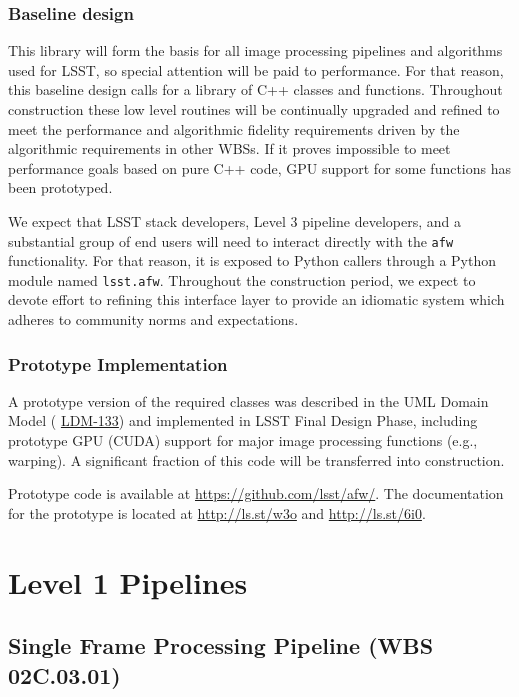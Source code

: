 \documentclass[12pt]{article}
\newcommand{\ds}[2]{{\color{blue} \href{https://docushare.lsstcorp.org/docushare/dsweb/Get/#1}{#2}}\xspace}
\newcommand{\appsUMLdomain}{\ds{LDM-133}{LDM-133}}
\newcommand{\wbsSFM}{WBS 02C.03.01}
\begin{document}
\subsubsection{Baseline design}

This library will form the basis for all image processing pipelines and algorithms used for LSST, so special attention will be paid to performance. For that reason, this baseline design calls for a library of C++ classes and functions. Throughout construction these low level routines will be continually upgraded and refined to meet the performance and algorithmic fidelity requirements driven by the algorithmic requirements in other WBSs. If it proves impossible to meet performance goals based on pure C++ code, GPU support for some functions has been prototyped.

We expect that LSST stack developers, Level 3 pipeline developers, and a substantial group of end users will need to interact directly with the \texttt{afw} functionality. For that reason, it is exposed to Python callers through a Python module named \texttt{lsst.afw}. Throughout the construction period, we expect to devote effort to refining this interface layer to provide an idiomatic system which adheres to community norms and expectations.

\subsubsection{Prototype Implementation}

A prototype version of the required classes was described in the UML Domain Model (\appsUMLdomain{}) and implemented in LSST Final Design Phase, including prototype GPU (CUDA) support for major image processing functions (e.g., warping). A significant fraction of this code will be transferred into construction.

Prototype code is available at \url{https://github.com/lsst/afw/}. The documentation for the prototype is located at \url{http://ls.st/w3o} and \url{http://ls.st/6i0}.

\clearpage

\section{Level 1 Pipelines}

\subsection{Single Frame Processing Pipeline (\wbsSFM)}
\end{document}
